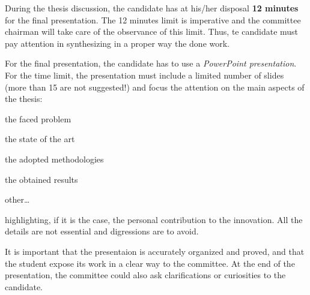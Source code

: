 During the thesis discussion, the candidate has at his/her disposal {\bfseries 12 minutes} for the final presentation. The 12 minutes limit is imperative and the committee chairman will take care of the observance of this limit. Thus, te candidate must pay attention in synthesizing in a proper way the done work.

For the final presentation, the candidate has to use a \emph{PowerPoint presentation}. For the time limit, the presentation must include a limited number of slides (more than 15 are not suggested!) and focus the attention on the main aspects of the thesis:
\begin{compactitem}
\item the faced problem
\item the state of the art
\item the adopted methodologies
\item the obtained results
\item other\dots
\end{compactitem}
highlighting, if it is the case, the personal contribution to the innovation. All the details are not essential and digressions are to avoid.

It is important that the presentaion is accurately organized and proved, and that the student expose its work in a clear way to the committee. At the end of the presentation, the committee could also ask clarifications or curiosities to the candidate.


